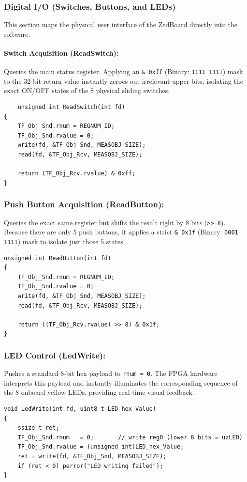 \subsubsection{Digital I/O (Switches, Buttons, and LEDs)}
This section maps the physical user interface of the ZedBoard directly into the software.

\paragraph{Switch Acquisition (ReadSwitch): }
Queries the main status register. Applying an \texttt{\& 0xff} (Binary: \texttt{1111 1111}) mask to the 32-bit return value instantly zeroes out irrelevant upper bits, isolating the exact ON/OFF states of the 8 physical sliding switches.

\begin{verbatim}
    unsigned int ReadSwitch(int fd)
{
    TF_Obj_Snd.rnum = REGNUM_ID;
    TF_Obj_Snd.rvalue = 0;
    write(fd, &TF_Obj_Snd, MEASOBJ_SIZE);
    read(fd, &TF_Obj_Rcv, MEASOBJ_SIZE);
    
    return (TF_Obj_Rcv.rvalue) & 0xff;
}
\end{verbatim}

\subsubsection*{Push Button Acquisition (ReadButton): }
Queries the exact same register but shifts the result right by 8 bits (\texttt{>> 8}). Because there are only 5 push buttons, it applies a strict \texttt{\& 0x1f} (Binary: \texttt{0001 1111}) mask to isolate just those 5 states.
\begin{verbatim}
unsigned int ReadButton(int fd)
{
    TF_Obj_Snd.rnum = REGNUM_ID;
    TF_Obj_Snd.rvalue = 0;
    write(fd, &TF_Obj_Snd, MEASOBJ_SIZE);
    read(fd, &TF_Obj_Rcv, MEASOBJ_SIZE);

    return ((TF_Obj_Rcv.rvalue) >> 8) & 0x1f;
}
\end{verbatim}

\subsubsection*{LED Control (LedWrite): }
Pushes a standard 8-bit hex payload to \texttt{rnum = 0}. The FPGA hardware interprets this payload and instantly illuminates the corresponding sequence of the 8 onboard yellow LEDs, providing real-time visual feedback.

\begin{verbatim}
void LedWrite(int fd, uint8_t LED_hex_Value)
{
    ssize_t ret;
    TF_Obj_Snd.rnum   = 0;       // write reg0 (lower 8 bits = uzLED)
    TF_Obj_Snd.rvalue = (unsigned int)LED_hex_Value;
    ret = write(fd, &TF_Obj_Snd, MEASOBJ_SIZE);
    if (ret < 0) perror("LED writing failed");
}
\end{verbatim}








\clearpage 